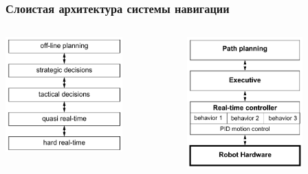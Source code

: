 \documentclass{../../slides-style}
\begin{document}
    \begin{frame}
        \frametitle{Слоистая архитектура системы навигации}
        \begin{columns}
            \begin{column}{0.5\textwidth}
                \begin{center}
                    \includegraphics[width=0.7\textwidth]{navigationLayers.png}
                \end{center}
            \end{column}
            \begin{column}{0.5\textwidth}
                \begin{center}
                    \includegraphics[width=0.7\textwidth]{navigationTiers.png}
                \end{center}
            \end{column}
        \end{columns}
    \end{frame}
\end{document}
